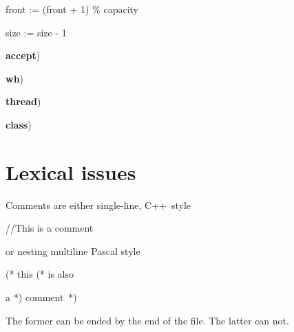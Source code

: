 \documentclass{article}%
\begin{document}
\begin{code}
\begin{indent}
\begin{indent}
\begin{indent}
\item \qquad\qquad front := (front + 1) \% capacity

\item \qquad\qquad size := size - 1

\item \textbf{accept})
\end{indent}

\item \textbf{wh})
\end{indent}

\item \textbf{thread})
\end{indent}

\textbf{class})
\end{code}

\section{Lexical issues\label{sec:LexicalIssues}}

Comments are either single-line, C++\ style

\begin{code}
//This is a comment
\end{code}

\noindent or nesting multiline Pascal style

\begin{code}
(* this (* is also

a *) comment\ *)
\end{code}

\noindent The former can be ended by the end of the file. The latter can not.
\end{document}
